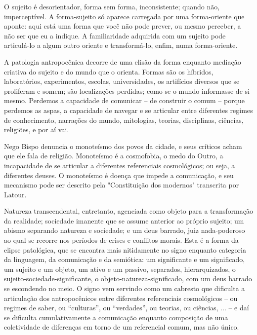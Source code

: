 O sujeito é desorientador, forma sem forma, inconsistente; quando não, imperceptível. A forma-sujeito só aparece carregada por uma forma-oriente que aponte: aqui está uma forma que você não pode prever, ou mesmo perceber, a não ser que eu a indique. A familiaridade adquirida com um sujeito pode articulá-lo a algum outro oriente e transformá-lo, enfim, numa forma-oriente.

A patologia antropocênica decorre de uma elisão da forma enquanto mediação criativa do sujeito e do mundo que o orienta. Formas são os híbridos, laboratórios, experimentos, escolas, universidades, os artifícios diversos que se proliferam e somem; são localizações perdidas; como se o mundo informasse de si mesmo. Perdemos a capacidade de comunicar -- de construir o comum -- porque perdemos as aspas, a capacidade de navegar e se articular entre diferentes regimes de conhecimento, narrações do mundo, mitologias, teorias, disciplinas, ciências, religiões, e por aí vai.

Nego Bispo denuncia o monoteísmo dos povos da cidade, e seus críticos acham que ele fala de religião. Monoteísmo é a cosmofobia, o medo do Outro, a incapacidade de se articular a diferentes referenciais cosmológicos; ou seja, a diferentes deuses. O monoteísmo é doença que impede a comunicação, e seu mecanismo pode ser descrito pela "Constituição dos modernos" transcrita por Latour.

Natureza transcendental, entretanto, agenciada como objeto para a transformação da realidade; sociedade imanente que se assume anterior ao próprio sujeito; um abismo separando natureza e sociedade; e um deus barrado, juiz nada-poderoso ao qual se recorre nos períodos de crises e conflitos morais. Esta é a forma da elipse patológica, que se encontra mais nitidamente no signo enquanto categoria da linguagem, da comunicação e da semiótica: um significante e um significado, um sujeito e um objeto, um ativo e um passivo, separados, hierarquizados, o sujeito-sociedade-significante, o objeto-natureza-significado, com um deus barrado se escondendo no meio. O signo vem servindo como um cabresto que dificulta a articulação dos antropocênicos entre diferentes referenciais cosmológicos -- ou regimes de saber, ou \enquote{culturas}, ou \enquote{verdades}, ou teorias, ou ciências, ... -- e daí se dificulta cumulativamente a comunicação enquanto composição de uma coletividade de diferenças em torno de um referencial comum, mas não único.

